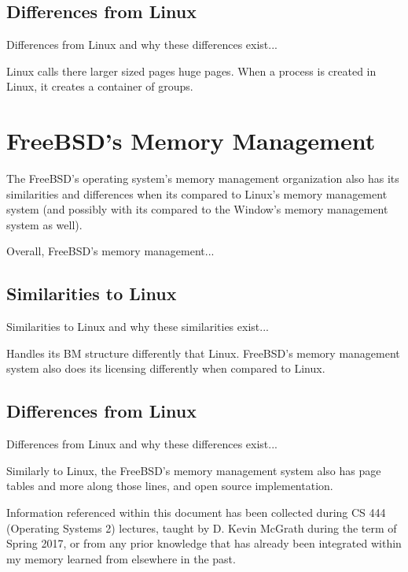 \documentclass[letterpaper,10pt,onecolumn]{IEEEtran}
\begin{document}
	\subsection*{Differences from Linux}
	Differences from Linux and why these differences exist...
	\par
	 Linux calls there larger sized pages huge pages. When a process is created in Linux, it creates a container of groups.

\section*{FreeBSD's Memory Management}
\par
The FreeBSD's operating system's memory management organization also has its similarities and differences when its compared to Linux's memory management system (and possibly with its compared to the Window's memory management system as well).
\par
Overall, FreeBSD's memory management...

	\subsection*{Similarities to Linux}
	Similarities to Linux and why these similarities exist...
	\par
	Handles its BM structure differently that Linux. FreeBSD's memory management system also does its licensing differently when compared to Linux.

	\subsection*{Differences from Linux}
	Differences from Linux and why these differences exist...
	\par
	Similarly to Linux, the FreeBSD's memory management system also has page tables and more along those lines, and open source implementation.

\newpage

\begin{thebibliography}{1}

Information referenced within this document has been collected during CS 444 (Operating Systems 2) lectures, taught by D. Kevin McGrath during the term of Spring 2017, or from any prior knowledge that has already been integrated within my memory learned from elsewhere in the past.

\iffalse
\bibitem{first}
F. Author. (year) 
\textit{title} 
[Online]. Available: 
\\\url{url}
\fi

\end{thebibliography}
\end{document}
